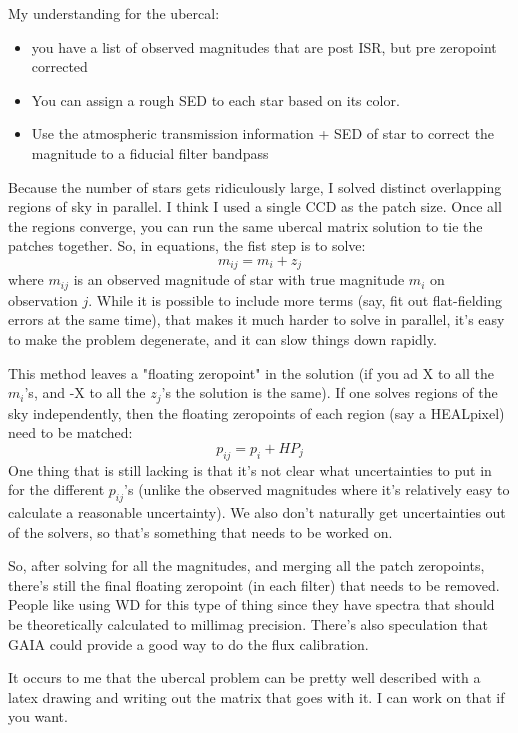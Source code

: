 My understanding for the ubercal:
\begin{itemize}
\item{you have a list of observed magnitudes that are post ISR, but pre zeropoint corrected}
\item{You can assign a rough SED to each star based on its color.}
\item{Use the atmospheric transmission information + SED of star to correct the magnitude to a fiducial filter bandpass}
\end{itemize}

Because the number of stars gets ridiculously large, I solved distinct overlapping regions of sky in parallel.  I think I used a single CCD as the patch size.  Once all the regions converge, you can run the same ubercal matrix solution to tie the patches together.  So, in equations, the fist step is to solve:
\begin{equation}
m_{ij} = m_i + z_j
\end{equation}
where $m_{ij}$ is an observed magnitude of star with true magnitude $m_i$ on observation $j$.  While it is possible to include more terms (say, fit out flat-fielding errors at the same time), that makes it much harder to solve in parallel, it's easy to make the problem degenerate, and it can slow things down rapidly. 

This method leaves a "floating zeropoint" in the solution (if you ad X to all the $m_i$'s, and -X to all the $z_j$'s the solution is the same).  If one solves regions of the sky independently, then the floating zeropoints of each region (say a HEALpixel) need to be matched:
\begin{equation}
p_{ij} = p_i + HP_j
\end{equation}
One thing that is still lacking is that it's not clear what uncertainties to put in for the different $p_{ij}$'s (unlike the observed magnitudes where it's relatively easy to calculate a reasonable uncertainty).  We also don't naturally get uncertainties out of the solvers, so that's something that needs to be worked on.

So, after solving for all the magnitudes, and merging all the patch zeropoints, there's still the final floating zeropoint (in each filter) that needs to be removed.  People like using WD for this type of thing since they have spectra that should be theoretically calculated to millimag precision.  There's also speculation that GAIA could provide a good way to do the flux calibration.  

It occurs to me that the ubercal problem can be pretty well described with a latex drawing and writing out the matrix that goes with it.  I can work on that if you want.



